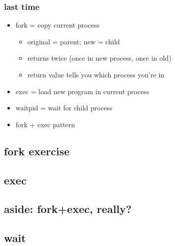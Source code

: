 \date{}
\title{}
\date{}

\begin{frame}
    \titlepage
\end{frame}



\usetikzlibrary{patterns}

\begin{frame}
\frametitle{last time}
\begin{itemize}
\item fork = copy current process
    \begin{itemize}
    \item original = parent; new = child
    \item returns twice (once in new process, once in old)
    \item return value tells you which process you're in
    \end{itemize}
\item exec = load new program in current process
\item waitpid = wait for child process
\item fork + exec pattern
\end{itemize}
\end{frame}




\subsection{fork exercise}




\subsection{exec}






\subsection{aside: fork+exec, really?}



\subsection{wait}

